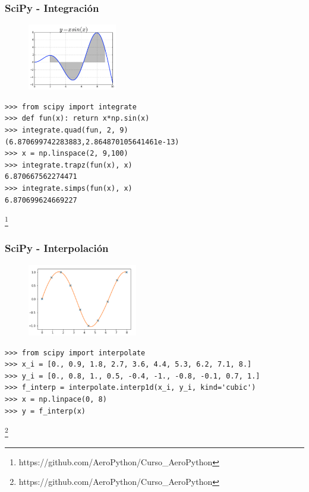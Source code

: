 \documentclass[18pt]{beamer}
\newcommand\blfootnote[1]{%
  \begingroup
  \renewcommand\thefootnote{}\footnote{#1}%
  \addtocounter{footnote}{-1}%
  \endgroup
}
\begin{document}
\begin{frame}[fragile]
	
	\frametitle{SciPy - Integración}

	\begin{figure}
		\includegraphics[width=3.9cm]{images/scipy_integrate.png}
	\end{figure}
	
	\begin{exampleblock}
	
    	\scriptsize
    	\begin{lstlisting}
>>> from scipy import integrate
>>> def fun(x): return x*np.sin(x)
>>> integrate.quad(fun, 2, 9)
(6.870699742283883,2.864870105641461e-13)
>>> x = np.linspace(2, 9,100)
>>> integrate.trapz(fun(x), x)
6.870667562274471
>>> integrate.simps(fun(x), x)
6.870699624669227
		\end{lstlisting}

	\end{exampleblock}
	
	\blfootnote{\scriptsize https://github.com/AeroPython/Curso\_AeroPython}

\end{frame}


\begin{frame}[fragile]
	
	\frametitle{SciPy - Interpolación}

	\begin{figure}
		\includegraphics[width=4.8cm]{images/SciPy_interpolate.png}
	\end{figure}
	
	\begin{exampleblock}
	
    	\scriptsize
    	\begin{lstlisting}
>>> from scipy import interpolate
>>> x_i = [0., 0.9, 1.8, 2.7, 3.6, 4.4, 5.3, 6.2, 7.1, 8.]
>>> y_i = [0., 0.8, 1., 0.5, -0.4, -1., -0.8, -0.1, 0.7, 1.]
>>> f_interp = interpolate.interp1d(x_i, y_i, kind='cubic')
>>> x = np.linpace(0, 8)
>>> y = f_interp(x)
		\end{lstlisting}

	\end{exampleblock}
	
	\blfootnote{\scriptsize https://github.com/AeroPython/Curso\_AeroPython}
	
\end{frame}
\end{document}
